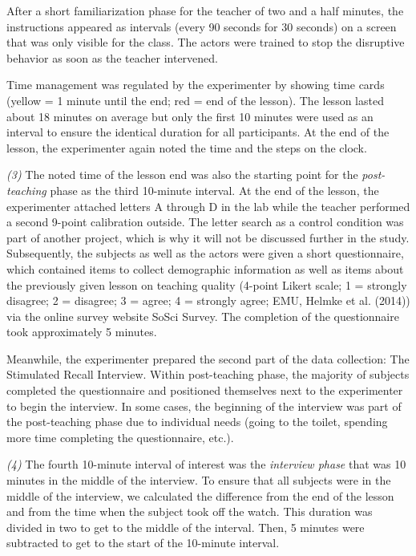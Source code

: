 \documentclass[
  man,floatsintext]{apa6}
\begin{document}
After a short familiarization phase for the teacher of two and a half minutes, the instructions appeared as intervals (every 90 seconds for 30 seconds) on a screen that was only visible for the class. The actors were trained to stop the disruptive behavior as soon as the teacher intervened.

Time management was regulated by the experimenter by showing time cards (yellow = 1 minute until the end; red = end of the lesson). The lesson lasted about 18 minutes on average but only the first 10 minutes were used as an interval to ensure the identical duration for all participants. At the end of the lesson, the experimenter again noted the time and the steps on the clock.

\emph{(3)} The noted time of the lesson end was also the starting point for the \emph{post-teaching} phase as the third 10-minute interval. At the end of the lesson, the experimenter attached letters A through D in the lab while the teacher performed a second 9-point calibration outside. The letter search as a control condition was part of another project, which is why it will not be discussed further in the study. Subsequently, the subjects as well as the actors were given a short questionnaire, which contained items to collect demographic information as well as items about the previously given lesson on teaching quality (4-point Likert scale; 1 = strongly disagree; 2 = disagree; 3 = agree; 4 = strongly agree; EMU, Helmke et al. (2014)) via the online survey website SoSci Survey. The completion of the questionnaire took approximately 5 minutes.

Meanwhile, the experimenter prepared the second part of the data collection: The Stimulated Recall Interview. Within post-teaching phase, the majority of subjects completed the questionnaire and positioned themselves next to the experimenter to begin the interview. In some cases, the beginning of the interview was part of the post-teaching phase due to individual needs (going to the toilet, spending more time completing the questionnaire, etc.).

\emph{(4)} The fourth 10-minute interval of interest was the \emph{interview phase} that was 10 minutes in the middle of the interview. To ensure that all subjects were in the middle of the interview, we calculated the difference from the end of the lesson and from the time when the subject took off the watch. This duration was divided in two to get to the middle of the interval. Then, 5 minutes were subtracted to get to the start of the 10-minute interval.
\end{document}
